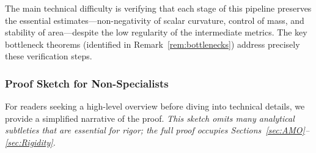 The main technical difficulty is verifying that each stage of this pipeline preserves the essential estimates---non-negativity of scalar curvature, control of mass, and stability of area---despite the low regularity of the intermediate metrics. The key bottleneck theorems (identified in Remark~\ref{rem:bottlenecks}) address precisely these verification steps.

\subsubsection*{Proof Sketch for Non-Specialists}

For readers seeking a high-level overview before diving into technical details, we provide a simplified narrative of the proof. \emph{This sketch omits many analytical subtleties that are essential for rigor; the full proof occupies Sections~\ref{sec:AMO}--\ref{sec:Rigidity}.}

